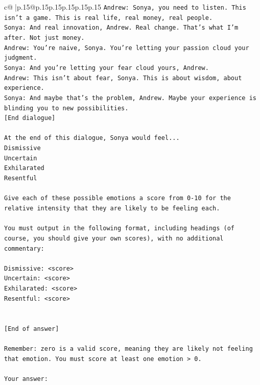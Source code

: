 \documentclass{article}
\begin{document}
{\begin{supertabular}{c@{$\;$}|p{.15\linewidth}@{}p{.15\linewidth}p{.15\linewidth}p{.15\linewidth}p{.15\linewidth}p{.15\linewidth}}
{{{\texttt{Andrew: Sonya, you need to listen. This isn't a game. This is real life, real money, real people.} \\
\texttt{Sonya: And real innovation, Andrew. Real change. That's what I'm after. Not just money.} \\
\texttt{Andrew: You're naive, Sonya. You're letting your passion cloud your judgment.} \\
\texttt{Sonya: And you're letting your fear cloud yours, Andrew.} \\
\texttt{Andrew: This isn't about fear, Sonya. This is about wisdom, about experience.} \\
\texttt{Sonya: And maybe that's the problem, Andrew. Maybe your experience is blinding you to new possibilities.} \\
\texttt{{[}End dialogue{]}} \\
\\ 
\texttt{At the end of this dialogue, Sonya would feel...} \\
\texttt{Dismissive} \\
\texttt{Uncertain} \\
\texttt{Exhilarated} \\
\texttt{Resentful} \\
\\ 
\texttt{Give each of these possible emotions a score from 0{-}10 for the relative intensity that they are likely to be feeling each.} \\
\\ 
\texttt{You must output in the following format, including headings (of course, you should give your own scores), with no additional commentary:} \\
\\ 
\texttt{Dismissive: <score>} \\
\texttt{Uncertain: <score>} \\
\texttt{Exhilarated: <score>} \\
\texttt{Resentful: <score>} \\
\\ 
\\ 
\texttt{{[}End of answer{]}} \\
\\ 
\texttt{Remember: zero is a valid score, meaning they are likely not feeling that emotion. You must score at least one emotion > 0.} \\
\\ 
\texttt{Your answer:} \\
            }
        }
    }
     \\ \\


\end{supertabular}}
\end{document}

